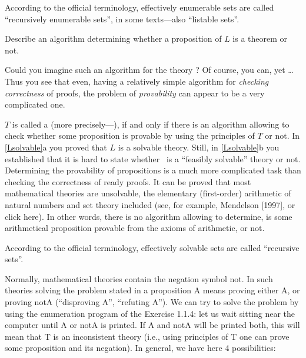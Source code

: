\begin{note}
According to the official terminology, effectively enumerable sets are called ``recursively enumerable sets'', in some texts---also ``listable sets''.
\end{note}

\begin{exer}\label{Lsolvable}
    \begin{inparaenum}[(a)]
        \item Describe an algorithm determining whether a proposition of \(L\) is a theorem or not.
        \item Could you imagine such an algorithm for the theory \CHESS?
        Of course, you can, yet \ldots
        Thus you see that even, having a relatively simple algorithm for \emph{checking correctness} of proofs, the problem of \emph{provability} can appear to be a very complicated one.
    \end{inparaenum}
\end{exer}

\(T\) is called a  (more precisely---), if and only if there is an algorithm allowing to check whether some proposition is provable by using the principles of \(T\) or not.
In \cref{Lsolvable}a you proved that \(L\) is a solvable theory.
Still, in \cref{Lsolvable}b you established that it is hard to state whether \CHESS\ is a ``feasibly solvable'' theory or not.
Determining the provability of propositions is a much more complicated task than checking the correctness of ready proofs.
It can be proved that most mathematical theories are unsolvable, the elementary (first-order) arithmetic of natural numbers and set theory included (see, for example, Mendelson [1997], or click here).
In other words, there is no algorithm allowing to determine, is some arithmetical proposition provable from the axioms of arithmetic, or not.

\begin{note}
According to the official terminology, effectively solvable sets are called ``recursive sets''.
\end{note}

Normally, mathematical theories contain the negation symbol not. In such theories solving the problem stated in a proposition A means proving either A, or proving notA (``disproving A'', ``refuting A''). We can try to solve the problem by using the enumeration program of the Exercise 1.1.4: let us wait sitting near the computer until A or notA is printed. If A and notA will be printed both, this will mean that T is an inconsistent theory (i.e., using principles of T one can prove some proposition and its negation). In general, we have here 4 possibilities:

